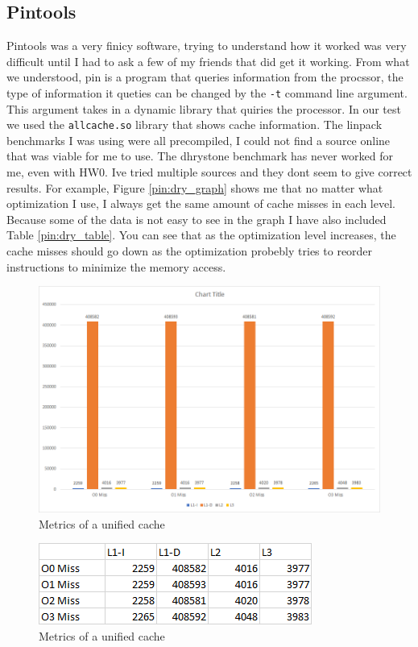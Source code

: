 \documentclass{article}
\begin{document}
	\subsection{Pintools}
		Pintools was a very finicy software, trying to understand how it worked was very difficult until I had to ask a few of my friends that did get it working. From what we understood, pin is a program that queries information from the procssor, the type of information it queties can be changed by the \verb|-t| command line argument. This argument takes in a dynamic library that quiries the processor. In our test we used the \verb|allcache.so| library that shows cache information. The linpack benchmarks I was using were all precompiled, I could not find a source online that was viable for me to use. The dhrystone benchmark has never worked for me, even with HW0. Ive tried multiple sources and they dont seem to give correct results. For example, Figure \ref{pin:dry_graph} shows me that no matter what optimization I use, I always get the same amount of cache misses in each level. Because some of the data is not easy to see in the graph I have also included Table \ref{pin:dry_table}. You can see that as the optimization level increases, the cache misses should go down as the optimization probebly tries to reorder instructions to minimize the memory access.
		\begin{figure}[H]
			\label{fig:dry_graph}
			\begin{center}
				\includegraphics[width=\textwidth]{dry_graph.png}
				\caption{Metrics of a unified cache}
			\end{center}
		\end{figure}
		\begin{figure}[H]
			\label{fig:dry_table}
			\begin{center}
				\includegraphics[width=\textwidth]{dry_table.png}
				\caption{Metrics of a unified cache}
			\end{center}
		\end{figure}
\end{document}
